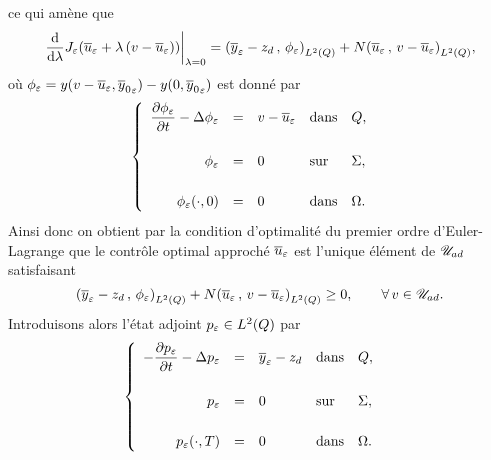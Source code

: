 ce qui amène que
\begin{equation*}
    {\left.{%
        \dfrac{\diff}{\diff{\lambda}}J_{\veps}\!\left({%
            \bareps{u} + \lambda\left({v - \bareps{u}}\right)
        }\right)
    }\right|}_{\lambda = 0} = \scalaireq{%
        \bareps{y} - z_{d}
    }{%
        \fieps{}
    } + N\scalaireq{\bareps{u}}{v - \bareps{u}},
\end{equation*}
où ${\phi}_{\varepsilon} = y\!\left({v - {\overline{u}}_{\varepsilon}, {\overline{y}_{0}}_{\varepsilon}}\right) -
y\!\left({0, {\overline{y}_{0}}_{\varepsilon}}\right)$ est donné par
\begin{equation}\label{eq:control125}
    \begin{cases}\displaystyle
        \begin{array}{rclll}
            \dfrac{\partial{}{\phi}_{\varepsilon}}{\partial{}t} - \Delta{\phi}_{\varepsilon} & = & v - {\overline{u}}_{\varepsilon} &
            \text{dans} & Q,\\
            \\
            {\phi}_{\varepsilon} & = & 0 & \text{sur} & \Sigma,\\
            \\
            {{\phi}_{\varepsilon}}\!\left({\cdot, 0}\right) & = & 0 & \text{dans} & \Omega.
        \end{array}
    \end{cases}
\end{equation}
Ainsi donc on obtient par la condition d'optimalité du premier ordre
d'Euler-Lagrange que le contrôle optimal approché ${\overline{u}}_{\varepsilon}$ est l'unique
élément de ${\mathscr{U}}_{ad}$ satisfaisant
\begin{equation}\label{eq:control126}
    \scalaireq{%
        \bareps{y} - z_{d}
    }{%
        \fieps{}
    } + N\scalaireq{%
        \bareps{u}
    }{%
        v - \bareps{u}
    } \geq 0,\qquad\forall\,v\in\uad.
\end{equation}
Introduisons alors l'état adjoint $p_{\varepsilon}\in L^{2}\!\left({Q}\right)$ par
\begin{equation*}
    \begin{cases}\displaystyle
        \begin{array}{rclll}
            -\dfrac{\partial{}p_{\varepsilon}}{\partial{}t} - \Delta p_{\varepsilon} & = & {\overline{y}}_{\varepsilon} -
            z_{d} & \text{dans} & Q,\\
            \\
            p_{\varepsilon} & = & 0 & \text{sur} & \Sigma,\\
            \\
            {p_{\varepsilon}}\!\left({\cdot,T}\right) & = & 0 & \text{dans} & \Omega.
        \end{array}
    \end{cases}
\end{equation*}
